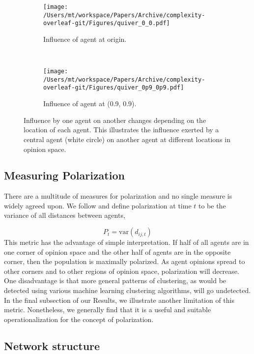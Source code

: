 \begin{figure}[H]
  \centering
  \begin{subfigure}[t]{\textwidth}
    \centering
    \texttt{[image: /Users/mt/workspace/Papers/Archive/complexity-overleaf-git/Figures/quiver\_0\_0.pdf]}
    \caption{Influence of agent at origin.}
  \end{subfigure}\\[2em]
  \begin{subfigure}[t]{\textwidth}
    \centering
    \texttt{[image: /Users/mt/workspace/Papers/Archive/complexity-overleaf-git/Figures/quiver\_0p9\_0p9.pdf]}
    \caption{Influence of agent at (0.9, 0.9).}
  \end{subfigure}
  \caption{Influence by one agent on another changes 
    depending on the location of each agent. This illustrates the influence
    exerted by a central agent (white circle) on another agent at different
    locations in opinion space. 
  }
  \noautomath
  \label{fig:dyadInfluence}
\end{figure}

\subsection{Measuring Polarization}

There are a multitude of measures for polarization \cite{Bramson2016} and no single measure is widely agreed upon. We follow  and define polarization at 
time $t$ to be the variance of all distances between agents,

\begin{equation}
  P_t = \text{var}(d_{ij,t})
\end{equation}
\noindent
This metric has the advantage of simple interpretation. If half of all agents are
in one corner of opinion space and the other half of agents are in the
opposite corner, then the population is maximally polarized. As agent opinions
spread to other corners and to other regions of opinion space, polarization
will decrease. One disadvantage is that more general patterns of clustering,
as would be detected using various machine learning clustering algorithms, will go undetected. In the final subsection of our Results, we illustrate another limitation of this metric. Nonetheless, we generally find that it is a useful and suitable operationalization for the concept of polarization. 


\subsection{Network structure}

